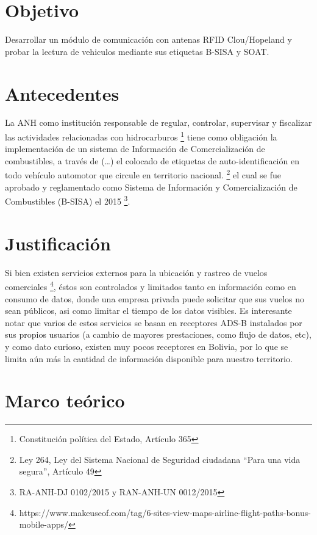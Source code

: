 \documentclass[fleqn,10pt]{SelfArx} %
\begin{document}

\section{Objetivo}

Desarrollar un módulo de comunicación con antenas RFID Clou/Hopeland y probar la lectura de vehiculos mediante sus etiquetas B-SISA y SOAT.

\section{Antecedentes}

La ANH como institución responsable de regular, controlar, supervisar y fiscalizar las actividades relacionadas con hidrocarburos \footnote{Constitución política del Estado, Artículo 365} tiene como obligación la implementación de un sistema de Información de Comercialización de combustibles, a través de (…) el colocado de etiquetas de auto-identificación en todo vehículo automotor que circule en territorio nacional. \footnote{Ley 264, Ley del Sistema Nacional de Seguridad ciudadana “Para una vida segura”, Artículo 49} el cual se fue aprobado y reglamentado como Sistema de Información y Comercialización de Combustibles (B-SISA) el 2015 \footnote{RA-ANH-DJ 0102/2015 y RAN-ANH-UN 0012/2015}.

\section{Justificación}

Si bien existen servicios externos para la ubicación y rastreo de vuelos comerciales \footnote{https://www.makeuseof.com/tag/6-sites-view-maps-airline-flight-paths-bonus-mobile-apps/}, éstos son controlados y limitados tanto en información como en consumo de datos, donde una empresa privada puede solicitar que sus vuelos no sean públicos, asi como limitar el tiempo de los datos visibles. Es interesante notar que varios de estos servicios se basan en receptores ADS-B instalados por sus propios usuarios (a cambio de mayores prestaciones, como flujo de datos, etc), y como dato curioso, existen muy pocos receptores en Bolivia, por lo que se limita aún más la cantidad de información disponible para nuestro territorio.


\section{Marco teórico}
\end{document}
